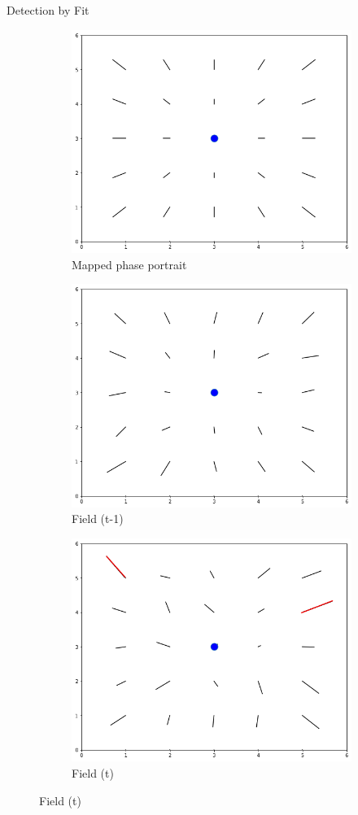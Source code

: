 \documentclass{beamer}
\begin{document}
\begin{frame}{Detection by Fit}
\begin{figure}[h!]
	\begin{subfigure}[t]{1\textwidth}
		
		\centering
		\includegraphics[width=0.25\linewidth]{images/fit_match1.png}
		
		\caption{Mapped phase portrait}
	\end{subfigure}   
	\begin{subfigure}[t]{.25\textwidth}
		
		\includegraphics[width=\linewidth]{images/fit_match_a.png}
		\caption{Field (t-1) }
		
	\end{subfigure}\hfill%
	\begin{subfigure}[t]{.25\textwidth}
		\centering
		\includegraphics[width=1\linewidth]{images/fit_match_b.png}
		\caption{Field (t)}
		

\end{subfigure}
\end{figure}
\end{frame}
\end{document}

